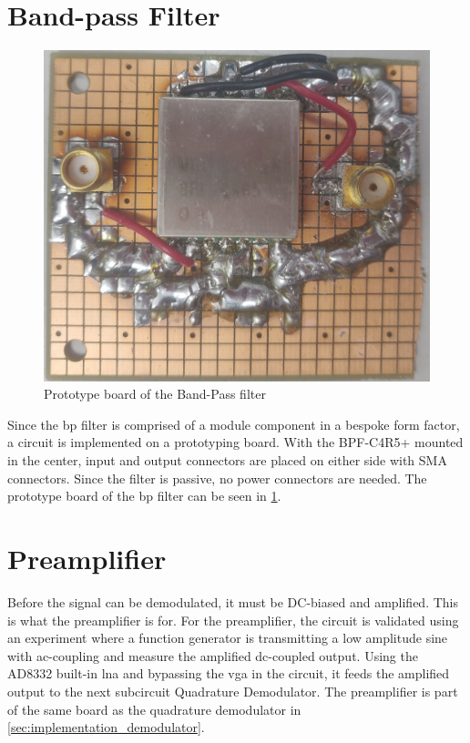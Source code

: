 \section{Band-pass Filter}
\begin{figure}[htbp]
	\centering
	\includegraphics[width=.8\textwidth]{Figures/4_bpf_pcb_pic.jpg}
	\caption{Prototype board of the Band-Pass filter}
	\label{fig:4_bpf_pcb_pic}
\end{figure}
Since the \gls{bp} filter is comprised of a module component in a bespoke form factor, a circuit is implemented on a prototyping board. With the BPF-C4R5+ mounted in the center, input and output connectors are placed on either side with SMA connectors. Since the filter is passive, no power connectors are needed. The prototype board of the \gls{bp} filter can be seen in \cref{fig:4_bpf_pcb_pic}.

\section{Preamplifier}
Before the signal can be demodulated, it must be DC-biased and amplified. This is what the preamplifier is for. For the preamplifier, the circuit is validated using an experiment where a function generator is transmitting a low amplitude sine with ac-coupling and measure the amplified dc-coupled output. Using the AD8332 built-in \gls{lna} and bypassing the \gls{vga} in the circuit, it feeds the amplified output to the next subcircuit Quadrature Demodulator. The preamplifier is part of the same board as the quadrature demodulator in \cref{sec:implementation_demodulator}.

